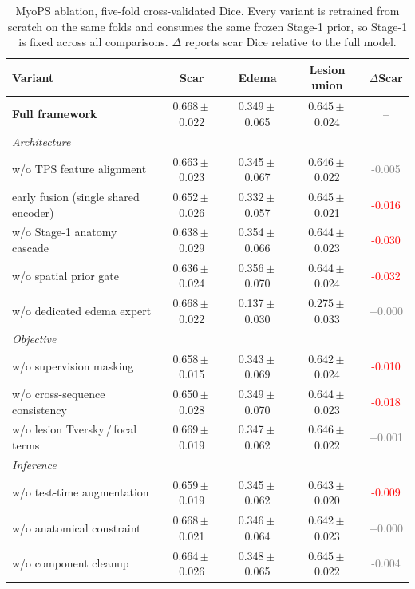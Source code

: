 \documentclass[runningheads]{llncs}
\begin{document}
\begin{table}[t]
\centering
\caption{MyoPS ablation, five-fold cross-validated Dice. Every variant is
retrained from scratch on the same folds and consumes the same frozen Stage-1
prior, so Stage-1 is fixed across all comparisons. $\Delta$ reports scar Dice
relative to the full model.}
\label{tab:ablation_myops}
\setlength{\tabcolsep}{4pt}
\begin{tabular}{lcccc}
\toprule
Variant & Scar & Edema & Lesion union & $\Delta$Scar \\
\midrule
\textbf{Full framework} & 0.668\,{\tiny $\pm$\,0.022} & 0.349\,{\tiny $\pm$\,0.065} & 0.645\,{\tiny $\pm$\,0.024} & -- \\
\midrule
\multicolumn{5}{l}{\textit{Architecture}} \\
\quad w/o TPS feature alignment & 0.663\,{\tiny $\pm$\,0.023} & 0.345\,{\tiny $\pm$\,0.067} & 0.646\,{\tiny $\pm$\,0.022} & \textcolor{gray}{-0.005} \\
\quad early fusion (single shared encoder) & 0.652\,{\tiny $\pm$\,0.026} & 0.332\,{\tiny $\pm$\,0.057} & 0.645\,{\tiny $\pm$\,0.021} & \textcolor{red}{-0.016} \\
\quad w/o Stage-1 anatomy cascade & 0.638\,{\tiny $\pm$\,0.029} & 0.354\,{\tiny $\pm$\,0.066} & 0.644\,{\tiny $\pm$\,0.023} & \textcolor{red}{-0.030} \\
\quad w/o spatial prior gate & 0.636\,{\tiny $\pm$\,0.024} & 0.356\,{\tiny $\pm$\,0.070} & 0.644\,{\tiny $\pm$\,0.024} & \textcolor{red}{-0.032} \\
\quad w/o dedicated edema expert & 0.668\,{\tiny $\pm$\,0.022} & 0.137\,{\tiny $\pm$\,0.030} & 0.275\,{\tiny $\pm$\,0.033} & \textcolor{gray}{+0.000} \\
\midrule
\multicolumn{5}{l}{\textit{Objective}} \\
\quad w/o supervision masking & 0.658\,{\tiny $\pm$\,0.015} & 0.343\,{\tiny $\pm$\,0.069} & 0.642\,{\tiny $\pm$\,0.024} & \textcolor{red}{-0.010} \\
\quad w/o cross-sequence consistency & 0.650\,{\tiny $\pm$\,0.028} & 0.349\,{\tiny $\pm$\,0.070} & 0.644\,{\tiny $\pm$\,0.023} & \textcolor{red}{-0.018} \\
\quad w/o lesion Tversky\,/\,focal terms & 0.669\,{\tiny $\pm$\,0.019} & 0.347\,{\tiny $\pm$\,0.062} & 0.646\,{\tiny $\pm$\,0.022} & \textcolor{gray}{+0.001} \\
\midrule
\multicolumn{5}{l}{\textit{Inference}} \\
\quad w/o test-time augmentation & 0.659\,{\tiny $\pm$\,0.019} & 0.345\,{\tiny $\pm$\,0.062} & 0.643\,{\tiny $\pm$\,0.020} & \textcolor{red}{-0.009} \\
\quad w/o anatomical constraint & 0.668\,{\tiny $\pm$\,0.021} & 0.346\,{\tiny $\pm$\,0.064} & 0.642\,{\tiny $\pm$\,0.023} & \textcolor{gray}{+0.000} \\
\quad w/o component cleanup & 0.664\,{\tiny $\pm$\,0.026} & 0.348\,{\tiny $\pm$\,0.065} & 0.645\,{\tiny $\pm$\,0.022} & \textcolor{gray}{-0.004} \\
\bottomrule
\end{tabular}
\end{table}
\end{document}
